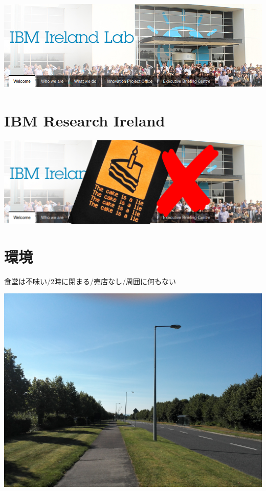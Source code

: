\includegraphics{img/static/campus.png}

\section{IBM Research Ireland}
\label{sec-9}

\includegraphics{img/campus-fake.png}

\section{環境}
\label{sec-10}

食堂は不味い/2時に閉まる/売店なし/周囲に何もない

\includegraphics{img/static/nothing.jpg}

